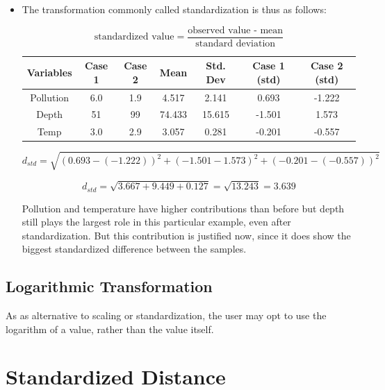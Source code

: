 \documentclass[a4paper,12pt]{report}
\begin{document}
\begin{itemize}
\item The transformation commonly called standardization is thus as follows:

\[\mbox{standardized value} = \frac{\mbox{observed value - mean}}{ \mbox{standard deviation}}\]
\begin{center}
	\begin{tabular}{|c|c|c|c|c|c|c|}
		\hline
		Variables & Case 1 & Case 2 & Mean & Std. Dev & Case 1 (std) & Case 2 (std) \\ \hline
		Pollution & 6.0 & 1.9 & 4.517	&	2.141	&	0.693	&	-1.222	\\
		Depth & 51 & 99 & 74.433	&	15.615	&	-1.501	&	1.573	\\
		Temp & 3.0 & 2.9 & 3.057	&	0.281	&	-0.201	&	-0.557	\\
		\hline
	\end{tabular}
\end{center}

\[ d_{std} =  \sqrt{(0.693 - (- 1.222))^2 + (-1.501-1.573)^2 + (-0.201-(-0.557))^2} \]

\[ d_{std} = \sqrt{3.667 + 9.449 + 0.127} = \sqrt{13.243} = 3.639 \]

Pollution and temperature have higher contributions than before but depth still plays the
largest role in this particular example, even after standardization. But this contribution is
justified now, since it does show the biggest standardized difference between the samples. 
\end{itemize}
\subsection{Logarithmic Transformation}
As as alternative to scaling or standardization, the user may opt to use the logarithm of a value, rather than the value itself.




\section{Standardized Distance}
\end{document}

